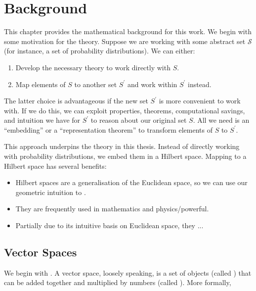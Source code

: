 \chapter{Background}
This chapter provides the mathematical background for this work. We begin with some motivation for the theory. Suppose we are working with some abstract set $\mathcal{S}$ (for instance, a set of probability distributions). We can either:

\begin{enumerate}
  \item Develop the necessary theory to work directly with $S$.
  \item Map elements of $S$ to another set $S^\prime$ and work within $S^\prime$ instead.
\end{enumerate}

The latter choice is advantageous if the new set $S^\prime$ is more convenient to work with. If we do this, we can exploit properties, theorems, computational savings, and intuition we have for $S^\prime$ to reason about our original set $S$. All we need is an ``embedding'' or a ``representation theorem'' to transform elements of $S$ to $S^\prime$.

This approach underpins the theory in this thesis. Instead of directly working with probability distributions, we embed them in a Hilbert space. Mapping to a Hilbert space has several benefits:

\begin{itemize}
	\item Hilbert spaces are a generalisation of the Euclidean space, so we can use our geometric intuition to .
    \item They are frequently used in mathematics and physics/powerful.
    \item Partially due to its intuitive basis on Euclidean space, they ... 
\end{itemize}



\section{Vector Spaces}
We begin with . A vector space, loosely speaking, is a set of objects (called ) that can be added together and multiplied by numbers (called ). More formally,

